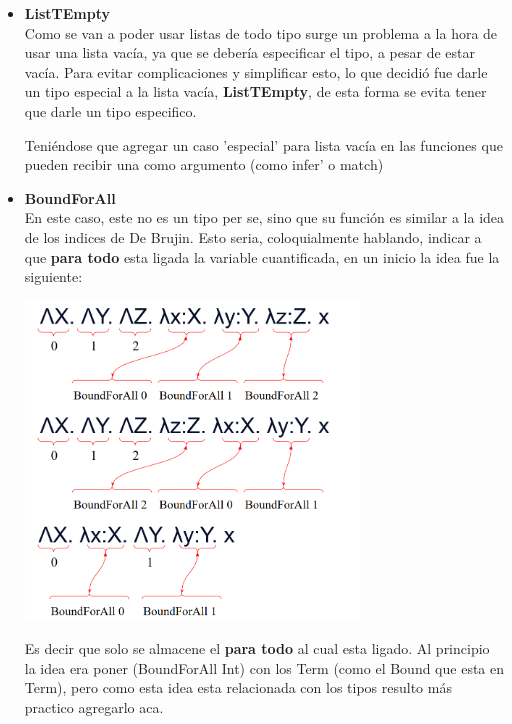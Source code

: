 \documentclass[12pt, titlepage, a4paper]{article}
\begin{document}
\begin{itemize}[label=$\bullet$]
  \item {\textbf{ListTEmpty}\\
  Como se van a poder usar listas de todo tipo surge un problema a la hora de usar una lista vacía, ya que se debería especificar el tipo, 
  a pesar de estar vacía. 
  Para evitar complicaciones y simplificar esto, lo que decidió fue darle un tipo especial a la lista vacía, \textbf{ListTEmpty}, de esta forma se evita 
  tener que darle un tipo especifico.
  
  Teniéndose que agregar un caso 'especial' para lista vacía en las funciones que pueden recibir una como argumento (como infer' o match)
  }

  \item {\textbf{BoundForAll}\\
  En este caso, este no es un tipo per se, sino que su función es similar a la idea 
  de los indices de De Brujin. Esto seria, coloquialmente hablando, indicar a que \textbf{para todo} esta ligada la variable cuantificada, 
  en un inicio la idea fue la siguiente:

  \begin{center}
      \includegraphics[width=0.7\textwidth]{Imagenes/EjemploBoundForAll.png}
  \end{center}

  Es decir que solo se almacene el \textbf{para todo} al cual esta ligado. 
  Al principio la idea era poner (BoundForAll Int) con los Term (como el Bound que esta en Term), pero como esta idea esta relacionada con 
  los tipos resulto más practico agregarlo aca.\\
  
}
\end{itemize}
\end{document}
